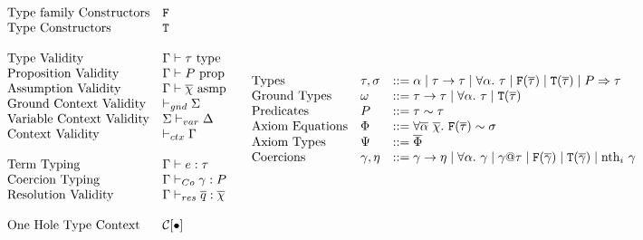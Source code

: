 \documentclass[format=sigplan,manuscript,review,screen,nonacm,margin=1in]{acmart}
\begin{document}
\begin{figure}[ht]
  \[
    \begin{array}{l l l}
      &\text{Type family Constructors} &\texttt{\FamCtrs}\\
      &\text{Type Constructors} &\texttt{\TypeCtrs}\\      
      \\
      &\text{Type Validity}               &\ValidType \TEnv \tau\\
      &\text{Proposition Validity}        &\ValidProp \TEnv \Preds\\
      &\text{Assumption Validity}      &\ValidAssmp \TEnv {\many\chi}\\
      &\text{Ground Context Validity}     &\ValidGCtx{\GEnv}\\
      &\text{Variable Context Validity}   &\ValidVCtx\GEnv\VEnv\\
      &\text{Context Validity}            &\ValidCtx\TEnv\\
      \\
      &\text{Term Typing}              &\Typing \TEnv \Tm \tau\\
      &\text{Coercion Typing}          &\CoTyping \TEnv \Co \Preds\\
      &\text{Resolution Validity}      &\ResTyping \TEnv {\many q} {\many\chi}\\
      \\
      &\text{One Hole Type Context}    &\TEvalCtxt{\bullet}
    \end{array}
    \begin{array}{l l l l l}
      &\text{Types}           &\tau,\sigma  &\bnfeq \alpha \bnfor \tau\to\tau \bnfor \Forall\alpha\tau
                                              \bnfor \FamCtrs(\many\tau) \bnfor \TypeCtrs(\many\tau)
                                              \bnfor \shaded{\Preds\then\tau}&\\
      &\text{Ground Types}    &\GTy         &\bnfeq \tau\to\tau \bnfor \Forall\alpha\tau \bnfor \TypeCtrs(\many\tau)\\
      &\text{Predicates}      &\Preds       &\bnfeq \tau\teq\tau\\
      &\text{Axiom Equations} &\AxiomEq     &\bnfeq \Forall{\many\alpha~\many\chi}{\FamCtrs(\many\tau) \teq \sigma}\\
      &\text{Axiom Types}     &\AxiomTy     &\bnfeq \many\AxiomEq\\
      &\text{Coercions}  &\Co,\MoreCo &\bnfeq \Co\to\MoreCo \bnfor \Forall\alpha\Co \bnfor \Co@\tau
                                        \bnfor \FamCtrs(\many{\Co})\bnfor\TypeCtrs(\many{\Co})\bnfor \nth i \Co\\

\end{array}\]
\end{figure}
\end{document}
